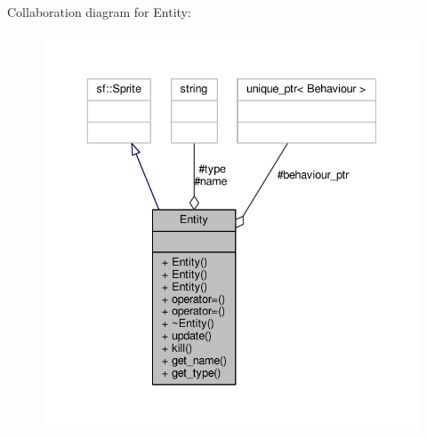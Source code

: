Collaboration diagram for Entity\+:\nopagebreak
\begin{figure}[H]
\begin{center}
\leavevmode
\includegraphics[width=336pt]{classEntity__coll__graph}
\end{center}
\end{figure}
